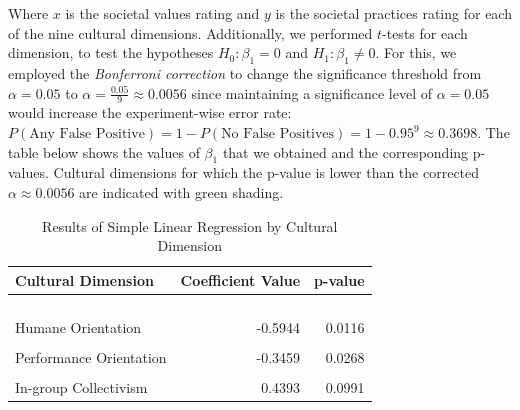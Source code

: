 \documentclass[
]{article}
\begin{document}
Where \(x\) is the societal values rating and \(y\) is the societal
practices rating for each of the nine cultural dimensions. Additionally,
we performed \(t\)-tests for each dimension, to test the hypotheses
\(H_0: \beta_1 = 0\) and \(H_1: \beta_1 \ne 0\). For this, we employed
the \emph{Bonferroni correction} to change the significance threshold
from \(\alpha = 0.05\) to \(\alpha = \frac{0.05}{9} \approx 0.0056\)
since maintaining a significance level of \(\alpha = 0.05\) would
increase the experiment-wise error rate:
\(P(\text{Any False Positive}) = 1 - P(\text{No False Positives}) = 1 - 0.95^{9} \approx 0.3698\).
The table below shows the values of \(\beta_1\) that we obtained and the
corresponding p-values. Cultural dimensions for which the p-value is
lower than the corrected \(\alpha \approx 0.0056\) are indicated with
green shading.

\begin{table}[!h]

\caption{\label{tab:SPV SLR Table}Results of Simple Linear Regression by Cultural Dimension}
\centering
\begin{tabular}[t]{lrr}
\toprule
Cultural Dimension & Coefficient Value & p-value\\
\midrule
\cellcolor[HTML]{E5F5E0}{Uncertainty Avoidance} & \cellcolor[HTML]{E5F5E0}{-0.6199} & \cellcolor[HTML]{E5F5E0}{0.0000}\\
\cellcolor[HTML]{E5F5E0}{Institutional Collectivism} & \cellcolor[HTML]{E5F5E0}{-0.5251} & \cellcolor[HTML]{E5F5E0}{0.0000}\\
\cellcolor[HTML]{E5F5E0}{Power Distance} & \cellcolor[HTML]{E5F5E0}{-0.4991} & \cellcolor[HTML]{E5F5E0}{0.0006}\\
\cellcolor[HTML]{E5F5E0}{Future Orientation} & \cellcolor[HTML]{E5F5E0}{-0.4725} & \cellcolor[HTML]{E5F5E0}{0.0009}\\
Humane Orientation & -0.5944 & 0.0116\\
\addlinespace
\cellcolor[HTML]{F0F0F0}{Gender Egalitarianism} & \cellcolor[HTML]{F0F0F0}{0.2437} & \cellcolor[HTML]{F0F0F0}{0.0124}\\
Performance Orientation & -0.3459 & 0.0268\\
\cellcolor[HTML]{F0F0F0}{Assertiveness} & \cellcolor[HTML]{F0F0F0}{-0.1507} & \cellcolor[HTML]{F0F0F0}{0.0414}\\
In-group Collectivism & 0.4393 & 0.0991\\
\bottomrule
\end{tabular}
\end{table}
\end{document}
